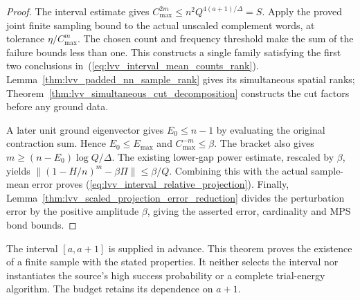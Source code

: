 \begin{proof}\leanok
    The interval estimate gives
    $C_{\max}^{2m}\le n^2Q^{4(a+1)/\Delta}=S$.
    Apply the proved joint finite sampling bound to the actual unscaled
    complement words, at tolerance $\eta/C_{\max}^m$. The chosen count
    and frequency threshold make the sum of the failure bounds less
    than one. This constructs a single family satisfying the first two
    conclusions in~(\ref{eq:lvv_interval_mean_counts_rank}).
    Lemma~\ref{thm:lvv_padded_nn_sample_rank} gives its simultaneous
    spatial ranks; Theorem~\ref{thm:lvv_simultaneous_cut_decomposition}
    constructs the cut factors before any ground data.

    A later unit ground eigenvector gives $E_0\le n-1$ by evaluating
    the original contraction sum. Hence $E_0\le E_{\max}$ and
    $C_{\max}^{-m}\le\beta$. The bracket also gives
    $m\ge(n-E_0)\log Q/\Delta$.
    The existing lower-gap power estimate, rescaled by $\beta$, yields
    $\|(1-H/n)^m-\beta\Pi\|\le\beta/Q$.
    Combining this with the actual sample-mean error proves
    (\ref{eq:lvv_interval_relative_projection}).
    Finally, Lemma~\ref{thm:lvv_scaled_projection_error_reduction}
    divides the perturbation error by the positive amplitude $\beta$,
    giving the asserted error, cardinality and MPS bond bounds.
\end{proof}

The interval $[a,a+1]$ is supplied in advance. This theorem proves the
existence of a finite sample with the stated properties. It neither
selects the interval nor instantiates the source's high success probability
or a complete trial-energy algorithm. The budget retains its dependence
on $a+1$.
